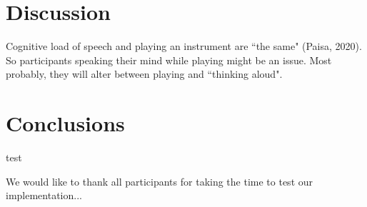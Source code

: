 \documentclass[dvipsnames, pdftex]{article}
\begin{document}
\section{Discussion}\label{sec:discussion}
Cognitive load of speech and playing an instrument are ``the same" (Paisa, 2020). So participants speaking their mind while playing might be an issue. Most probably, they will alter between playing and ``thinking aloud". 

\section{Conclusions}
test

\begin{acknowledgments}
We would like to thank all participants for taking the time to test our implementation...
\end{acknowledgments} 


\end{document}
